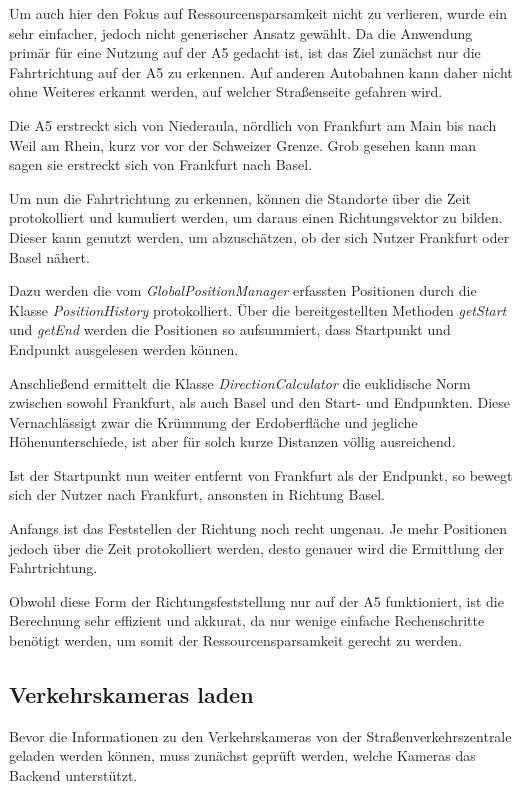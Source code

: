 Um auch hier den Fokus auf Ressourcensparsamkeit nicht zu verlieren, wurde ein sehr einfacher, jedoch nicht generischer Ansatz gewählt.
Da die Anwendung primär für eine Nutzung auf der A5 gedacht ist, ist das Ziel zunächst nur die Fahrtrichtung auf der A5 zu erkennen.
Auf anderen Autobahnen kann daher nicht ohne Weiteres erkannt werden, auf welcher Straßenseite gefahren wird.

Die A5 erstreckt sich von Niederaula, nördlich von Frankfurt am Main bis nach Weil am Rhein, kurz vor vor der Schweizer Grenze. Grob gesehen kann man sagen sie erstreckt sich von Frankfurt nach Basel.

Um nun die Fahrtrichtung zu erkennen, können die Standorte über die Zeit protokolliert und kumuliert werden, um daraus einen Richtungsvektor zu bilden.
Dieser kann genutzt werden, um abzuschätzen, ob der sich Nutzer Frankfurt oder Basel nähert.

Dazu werden die vom {\em GlobalPositionManager} erfassten Positionen durch die Klasse {\em PositionHistory} protokolliert.
Über die bereitgestellten Methoden {\em getStart} und {\em getEnd} werden die Positionen so aufsummiert, dass Startpunkt und Endpunkt ausgelesen werden können.

Anschließend ermittelt die Klasse {\em DirectionCalculator} die euklidische Norm zwischen sowohl Frankfurt, als auch Basel und den Start- und Endpunkten.
Diese Vernachlässigt zwar die Krümmung der Erdoberfläche und jegliche Höhenunterschiede, ist aber für solch kurze Distanzen völlig ausreichend.

Ist der Startpunkt nun weiter entfernt von Frankfurt als der Endpunkt, so bewegt sich der Nutzer nach Frankfurt, ansonsten in Richtung Basel.

Anfangs ist das Feststellen der Richtung noch recht ungenau. Je mehr Positionen jedoch über die Zeit protokolliert werden, desto genauer wird die Ermittlung der Fahrtrichtung.

Obwohl diese Form der Richtungsfeststellung nur auf der A5 funktioniert, ist die Berechnung sehr effizient und akkurat, da nur wenige einfache Rechenschritte benötigt werden, um somit der Ressourcensparsamkeit gerecht zu werden.

\subsection{Verkehrskameras laden}
Bevor die Informationen zu den Verkehrskameras von der Straßenverkehrszentrale geladen werden können, muss zunächst geprüft werden, welche Kameras das Backend unterstützt.

